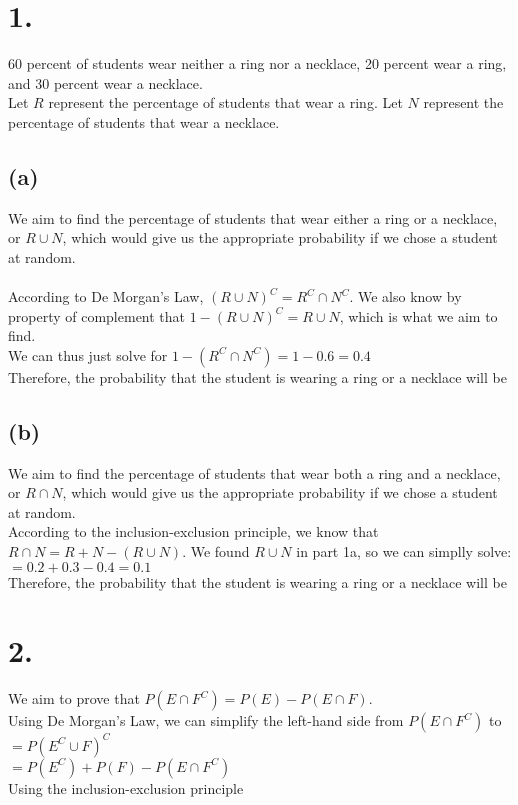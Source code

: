 \documentclass{article}
\begin{document}
\thispagestyle{firstpageheader}

\section*{1.}
{\Large 
60 percent of students wear neither a ring nor a necklace, 20 percent wear a ring, and 30 percent wear a necklace. \\ 
Let $R$ represent the percentage of students that wear a ring. Let $N$ represent the percentage of students that wear a necklace.

\subsection*{(a)}
 We aim to find the percentage of students that wear either a ring or a necklace, or $R \cup N$, which would give us the appropriate probability if we chose a student at random. \\ \\
According to De Morgan's Law, $(R \cup N)^C = R^C \cap N^C$. We also know by property of complement that $1 - (R \cup N)^C = R \cup N$, which is what we aim to find. \\
We can thus just solve for $1 - (R^C \cap N^C) = 1 - 0.6 = 0.4$ \\
Therefore, the probability that the student is wearing a ring or a necklace will be 

\subsection*{(b)}
We aim to find the percentage of students that wear both a ring and a necklace, or $R \cap N$, which would give us the appropriate probability if we chose a student at random. \\
According to the inclusion-exclusion principle, we know that $R \cap N = R + N - (R \cup N)$. We found $R \cup N$ in part 1a, so we can simplly solve: \\
$= 0.2 + 0.3 - 0.4 = 0.1$ \\
Therefore, the probability that the student is wearing a ring or a necklace will be 

}

\section*{2.}
{\Large

We aim to prove that $P(E \cap F^C) = P(E) - P(E \cap F)$. \\
Using De Morgan's Law, we can simplify the left-hand side from $P(E \cap F^C)$ to \\
$= P(E^C \cup F)^C$ \\
$= P(E^C) + P(F) - P(E \cap F^C)$ \\ Using the inclusion-exclusion principle

}
\end{document}
